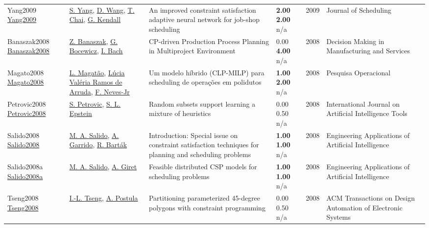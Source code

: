 {\begin{longtable}{p{3cm}p{5cm}p{10cm}p{1cm}rp{2.5cm}l}
Yang2009 \href{http://dx.doi.org/10.1007/s10951-009-0106-z}{Yang2009} & \hyperref[auth:a1823]{S. Yang}, \hyperref[auth:a1824]{D. Wang}, \hyperref[auth:a1825]{T. Chai}, \hyperref[auth:a1387]{G. Kendall} & \cellcolor{green!10}An improved constraint satisfaction adaptive neural network for job-shop scheduling & \noindent{}\textbf{2.00} \textbf{2.00} n/a & 2009 & Journal of Scheduling & \cite{Yang2009}\\
Banaszak2008 \href{http://dx.doi.org/10.7494/dmms.2008.2.2.5}{Banaszak2008} & \hyperref[auth:a1814]{Z. Banaszak}, \hyperref[auth:a630]{G. Bocewicz}, \hyperref[auth:a631]{I. Bach} & CP-driven Production Process Planning in Multiproject Environment & \noindent{}\textcolor{black!50}{0.00} \textbf{4.00} n/a & 2008 & Decision Making in Manufacturing and Services & \cite{Banaszak2008}\\
Magato2008 \href{http://dx.doi.org/10.1590/s0101-74382008000300007}{Magato2008} & \hyperref[auth:a1637]{L. Magatão}, \hyperref[auth:a1638]{Lúcia Valéria Ramos de Arruda}, \hyperref[auth:a1639]{F. Neves-Jr} & \cellcolor{gold!20}Um modelo híbrido (CLP-MILP) para scheduling de operações em polidutos & \noindent{}\textbf{1.00} \textbf{2.00} n/a & 2008 & Pesquisa Operacional & \cite{Magato2008}\\
Petrovic2008 \href{http://dx.doi.org/10.1142/s0218213008004023}{Petrovic2008} & \hyperref[auth:a1861]{S. Petrovic}, \hyperref[auth:a1862]{S. L. Epstein} & \cellcolor{green!10}Random subsets support learning a mixture of heuristics & \noindent{}\textcolor{black!50}{0.00} 0.50 n/a & 2008 & International Journal on Artificial Intelligence Tools & \cite{Petrovic2008}\\
Salido2008 \href{http://dx.doi.org/10.1016/j.engappai.2008.03.007}{Salido2008} & \hyperref[auth:a153]{M. A. Salido}, \hyperref[auth:a633]{A. Garrido}, \hyperref[auth:a1063]{R. Barták} & Introduction: Special issue on constraint satisfaction techniques for planning and scheduling problems & \noindent{}\textbf{1.00} \textbf{1.00} n/a & 2008 & Engineering Applications of Artificial Intelligence & \cite{Salido2008}\\
Salido2008a \href{http://dx.doi.org/10.1016/j.engappai.2008.03.006}{Salido2008a} & \hyperref[auth:a153]{M. A. Salido}, \hyperref[auth:a1941]{A. Giret} & \cellcolor{green!10}Feasible distributed CSP models for scheduling problems & \noindent{}\textbf{1.00} \textbf{1.00} n/a & 2008 & Engineering Applications of Artificial Intelligence & \cite{Salido2008a}\\
Tseng2008 \href{http://dx.doi.org/10.1145/1367045.1367061}{Tseng2008} & \hyperref[auth:a1682]{I.-L. Tseng}, \hyperref[auth:a1683]{A. Postula} & Partitioning parameterized 45-degree polygons with constraint programming & \noindent{}\textcolor{black!50}{0.00} 0.50 n/a & 2008 & ACM Transactions on Design Automation of Electronic Systems & \cite{Tseng2008}\\

\end{longtable}}
